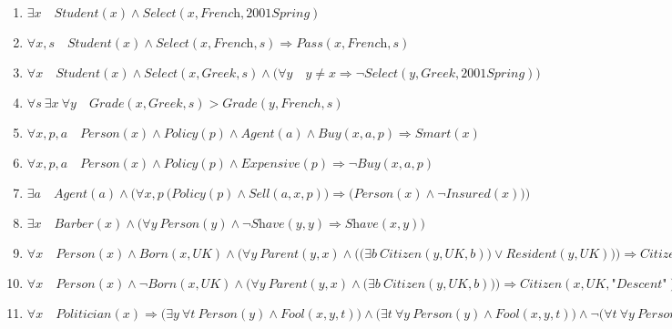 \documentclass{article}
\begin{document}
\begin{enumerate}[label = \emph{\alph*}.]
    \item $\exists x \quad \textit{Student}(x) \land \textit{Select}(x, \textit{French}, \textit{2001Spring})$
    \item $\forall x,s \quad \textit{Student}(x) \land \textit{Select}(x, \textit{French}, s) \Rightarrow \textit{Pass}(x, \textit{French}, s)$
    \item $\forall x \quad \textit{Student}(x) \land \textit{Select}(x, \textit{Greek}, s) \land \big(\forall y \quad y \neq x \Rightarrow \lnot \textit{Select}(y, \textit{Greek}, \textit{2001Spring})\big)$
    \item $\forall s\ \exists x\ \forall y \quad \textit{Grade}(x, \textit{Greek}, s) > \textit{Grade}(y, French, s)$
    \item $\forall x,p,a \quad \textit{Person}(x) \land \textit{Policy}(p) \land \textit{Agent}(a) \land \textit{Buy}(x, a, p) \Rightarrow \textit{Smart}(x)$
    \item $\forall x,p,a \quad \textit{Person}(x) \land \textit{Policy}(p) \land \textit{Expensive}(p) \Rightarrow \lnot \textit{Buy}(x, a, p)$
    \item $\exists a \quad \textit{Agent}(a) \land \Big(\forall x, p \ \big(\textit{Policy}(p) \land \textit{Sell}(a, x, p)\big) \Rightarrow \big(\textit{Person}(x) \land \lnot \textit{Insured}(x)\big)\Big)$
    \item $\exists x \quad \textit{Barber}(x) \land \big(\forall y \ \textit{Person}(y) \land \lnot \textit{Shave}(y,y) \Rightarrow \textit{Shave}(x,y)\big)$
    \item $\forall x \quad \textit{Person}(x) \land \textit{Born}(x, \textit{UK}) \land \bigg(\forall y \ \textit{Parent}(y,x) \land \Big(\big(\exists b \ \textit{Citizen}(y, \textit{UK}, b)\big) \lor \textit{Resident}(y, \textit{UK})\Big)\bigg) \Rightarrow \textit{Citizen}(x, \textit{UK}, \textit{"Birth"})$
    \item $\forall x \quad \textit{Person}(x) \land \lnot \textit{Born}(x, \textit{UK}) \land \Big(\forall y \ \textit{Parent}(y,x) \land \big(\exists b \ \textit{Citizen}(y, \textit{UK}, b)\big)\Big) \Rightarrow \textit{Citizen}(x, \textit{UK}, \textit{"Descent"})$
    \item $\forall x \quad \textit{Politician}(x) \Rightarrow \big(\exists y \  \forall t \ \textit{Person}(y) \land \textit{Fool}(x, y, t)\big) \land \big(\exists t \ \forall y \ \textit{Person}(y) \land \textit{Fool}(x, y, t)\big) \land \lnot\big(\forall t \ \forall y \ \textit{Person}(y) \land \textit{Fool}(x, y, t)\big)$
\end{enumerate}
\end{document}
